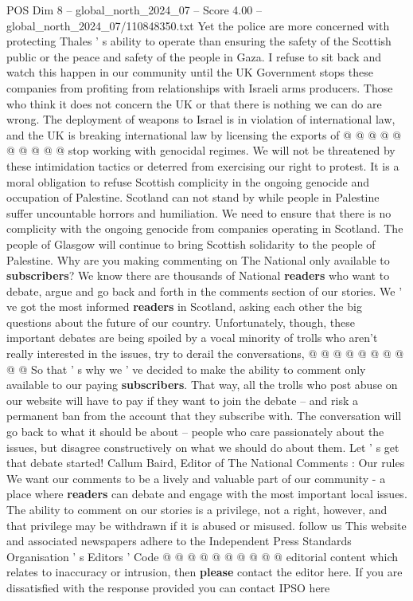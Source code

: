 \begin{textsample}{POS Dim 8 – global\_north\_2024\_07 – Score 4.00 – global\_north\_2024\_07/110848350.txt}
Yet the police are more concerned with protecting Thales ' s ability to operate than ensuring the safety of the Scottish public or the peace and safety of the people in Gaza.
I refuse to sit back and watch this happen in our community until the UK Government stops these companies from profiting from relationships with Israeli arms producers.
Those who think it does not concern the UK or that there is nothing we can do are wrong.
The deployment of weapons to Israel is in violation of international law, and the UK is breaking international law by licensing the exports of @ @ @ @ @ @ @ @ @ @ stop working with genocidal regimes.
We will not be threatened by these intimidation tactics or deterred from exercising our right to protest.
It is a moral obligation to refuse Scottish complicity in the ongoing genocide and occupation of Palestine.
Scotland can not stand by while people in Palestine suffer uncountable horrors and humiliation.
We need to ensure that there is no complicity with the ongoing genocide from companies operating in Scotland.
The people of Glasgow will continue to bring Scottish solidarity to the people of Palestine.
Why are you making commenting on The National only available to \textbf{subscribers}?
We know there are thousands of National \textbf{readers} who want to debate, argue and go back and forth in the comments section of our stories.
We ' ve got the most informed \textbf{readers} in Scotland, asking each other the big questions about the future of our country.
Unfortunately, though, these important debates are being spoiled by a vocal minority of trolls who aren't really interested in the issues, try to derail the conversations, @ @ @ @ @ @ @ @ @ @ So that ' s why we ' ve decided to make the ability to comment only available to our paying \textbf{subscribers}.
That way, all the trolls who post abuse on our website will have to pay if they want to join the debate -- and risk a permanent ban from the account that they subscribe with.
The conversation will go back to what it should be about -- people who care passionately about the issues, but disagree constructively on what we should do about them.
Let ' s get that debate started!
Callum Baird, Editor of The National Comments : Our rules We want our comments to be a lively and valuable part of our community - a place where \textbf{readers} can debate and engage with the most important local issues.
The ability to comment on our stories is a privilege, not a right, however, and that privilege may be withdrawn if it is abused or misused. follow us This website and associated newspapers adhere to the Independent Press Standards Organisation ' s Editors ' Code @ @ @ @ @ @ @ @ @ @ editorial content which relates to inaccuracy or intrusion, then \textbf{please} contact the editor here.
If you are dissatisfied with the response provided you can contact IPSO here

\end{textsample}
